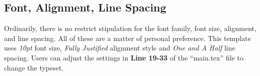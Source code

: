 \subsection{Font, Alignment, Line Spacing}
Ordinarily, there is no restrict stipulation for the font family, font size, alignment, and line spacing. All of these are a matter of personal preference. This template uses \textit{10pt} font size, \textit{Fully Justified} alignment style and \textit{One and A Half} line spacing. Users can adjust the settings in \textbf{Line 19-33} of the ``main.tex'' file to change the typeset.


